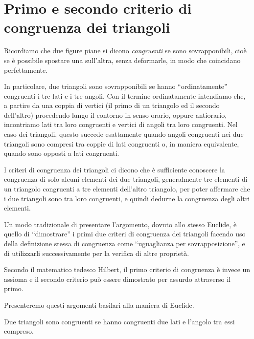 \section{Primo e secondo criterio di congruenza dei triangoli}\label{sect:primo_secondo_criterio_di_congruenza_triangoli}

Ricordiamo che due figure piane si dicono \emph{congruenti} se sono sovrapponibili, cioè se è possibile spostare una sull'altra, senza deformarle, in modo che coincidano perfettamente. 

In particolare, due triangoli sono sovrapponibili se hanno ``ordinatamente'' congruenti i tre lati e i tre angoli. Con il termine ordinatamente intendiamo che, a partire da una coppia di vertici (il primo di un triangolo ed il secondo dell'altro) procedendo lungo il contorno in senso orario, oppure antiorario, incontriamo lati tra loro congruenti e vertici di angoli tra loro congruenti. Nel caso dei triangoli, questo succede esattamente quando angoli congruenti nei due triangoli sono compresi tra coppie di lati congruenti o, in maniera equivalente, quando sono opposti a lati congruenti.

I criteri di congruenza dei triangoli ci dicono che è sufficiente conoscere la congruenza di solo alcuni elementi dei due triangoli, generalmente tre elementi di un triangolo congruenti a tre elementi dell'altro triangolo, per poter affermare che i due triangoli sono tra loro congruenti, e quindi dedurne la congruenza degli altri elementi.

Un modo tradizionale di presentare l'argomento, dovuto allo stesso Euclide, è quello di ``dimostrare'' i primi due criteri di congruenza dei triangoli facendo uso della definizione stessa di congruenza come ``uguaglianza per sovrapposizione'', e di utilizzarli successivamente per la verifica di altre proprietà.

Secondo il matematico tedesco Hilbert, il primo criterio di congruenza è invece un assioma e il secondo criterio può essere dimostrato per assurdo attraverso il primo. 

Presenteremo questi argomenti basilari alla maniera di Euclide.

\begin{teorema}
Due triangoli sono congruenti se hanno congruenti due lati e l'angolo tra essi compreso.
\end{teorema}

\begin{figure}[htb]
\centering
\end{figure}


